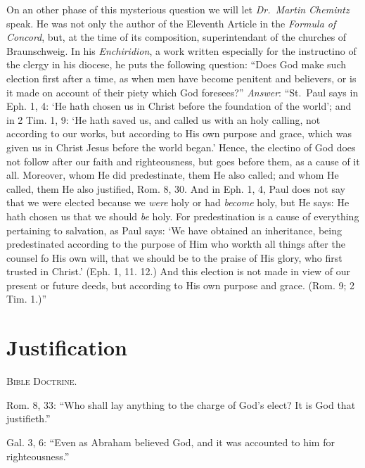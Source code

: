 \documentclass[
]{book}
\begin{document}
On an other phase of this mysterious question we will let \emph{Dr.~Martin Chemintz} speak. He was not only the author of the Eleventh Article in the \emph{Formula of Concord}, but, at the time of its composition, superintendant of the churches of Braunschweig. In his \emph{Enchiridion}, a work written especially for the instructino of the clergy in his diocese, he puts the following question: ``Does God make such election first after a time, as when men have become penitent and believers, or is it made on account of their piety which God foresees?'' \emph{Answer}: ``St.~Paul says in Eph. 1, 4: `He hath chosen us in Christ before the foundation of the world'; and in 2 Tim. 1, 9: `He hath saved us, and called us with an holy calling, not according to our works, but according to His own purpose and grace, which was given us in Christ Jesus before the world began.' Hence, the electino of God does not follow after our faith and righteousness, but goes before them, as a cause of it all. Moreover, whom He did predestinate, them He also called; and whom He called, them He also justified, Rom. 8, 30. And in Eph. 1, 4, Paul does not say that we were elected because we \emph{were} holy or had \emph{become} holy, but He says: He hath chosen us that we should \emph{be} holy. For predestination is a cause of everything pertaining to salvation, as Paul says: `We have obtained an inheritance, being predestinated according to the purpose of Him who workth all things after the counsel fo His own will, that we should be to the praise of His glory, who first trusted in Christ.' (Eph. 1, 11. 12.) And this election is not made in view of our present or future deeds, but according to His own purpose and grace. (Rom. 9; 2 Tim. 1.)''

\section*{\texorpdfstring{Justification}{Justification}}\label{justification}

\begin{center}
\textsc{Bible Doctrine.}
\end{center}

Rom. 8, 33: ``Who shall lay anything to the charge of God's elect? It is God that justifieth.''

Gal. 3, 6: ``Even as Abraham believed God, and it was accounted to him for righteousness.''
\end{document}
